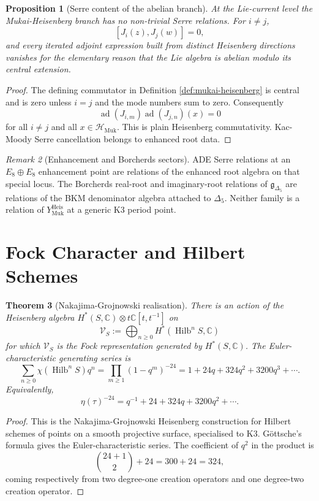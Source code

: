 \documentclass[11pt]{article}
\newtheorem{theorem}{Theorem}[section]
\newtheorem{proposition}[theorem]{Proposition}
\theoremstyle{definition}
\theoremstyle{remark}
\newtheorem{remark}[theorem]{Remark}
\DeclareMathOperator{\Hilb}{Hilb}
\newcommand{\gDel}{\mathfrak{g}_{\Delta_5}}
\newcommand{\Hmuk}{\mathcal{H}_{\mathrm{Muk}}}
\newcommand{\YHeis}{Y^{\mathrm{Heis}}_{\mathrm{Muk}}}
\begin{document}
\begin{proposition}[Serre content of the abelian branch]
\label{prop:abelian-serre}
At the Lie-current level the Mukai-Heisenberg branch has no
non-trivial Serre relations. For $i\neq j$,
\[
  [J_i(z),J_j(w)] = 0,
\]
and every iterated adjoint expression built from distinct Heisenberg
directions vanishes for the elementary reason that the Lie algebra is
abelian modulo its central extension.
\end{proposition}

\begin{proof}
The defining commutator in Definition \ref{def:mukai-heisenberg} is
central and is zero unless $i=j$ and the mode numbers sum to zero.
Consequently
\[
  \operatorname{ad}(J_{i,m})\operatorname{ad}(J_{j,n})(x)=0
\]
for all $i\neq j$ and all $x\in\Hmuk$. This is plain Heisenberg
commutativity. Kac-Moody Serre cancellation belongs to enhanced root
data.
\end{proof}

\begin{remark}[Enhancement and Borcherds sectors]
\label{rem:enhancement-borcherds}
ADE Serre relations at an $E_8\oplus E_8$ enhancement point are
relations of the enhanced root algebra on that special locus. The
Borcherds real-root and imaginary-root relations of
$\gDel$ are relations of the BKM denominator algebra attached to
$\Delta_5$. Neither family is a relation of $\YHeis$ at a generic
K3 period point.
\end{remark}

\section{Fock Character and Hilbert Schemes}
\label{sec:fock-character}

\begin{theorem}[Nakajima-Grojnowski realisation]
\label{thm:nakajima-grojnowski}
There is an action of the Heisenberg algebra
$H^*(S,\mathbb{C})\otimes t\mathbb{C}[t,t^{-1}]$ on
\[
  \mathcal{V}_S :=
  \bigoplus_{n\geq 0} H^*(\Hilb^n S,\mathbb{C})
\]
for which $\mathcal{V}_S$ is the Fock representation generated by
$H^*(S,\mathbb{C})$. The Euler-characteristic generating series is
\[
  \sum_{n\geq 0}\chi(\Hilb^n S)q^n
  =
  \prod_{m\geq 1}(1-q^m)^{-24}
  =
  1+24q+324q^2+3200q^3+\cdots .
\]
Equivalently,
\[
  \eta(\tau)^{-24}
  =
  q^{-1}+24+324q+3200q^2+\cdots .
\]
\end{theorem}

\begin{proof}
This is the Nakajima-Grojnowski Heisenberg construction for Hilbert
schemes of points on a smooth projective surface, specialised to K3.
G\"ottsche's formula gives the Euler-characteristic series. The
coefficient of $q^2$ in the product is
\[
  \binom{24+1}{2}+24=300+24=324,
\]
coming respectively from two degree-one creation operators and one
degree-two creation operator.
\end{proof}
\end{document}
